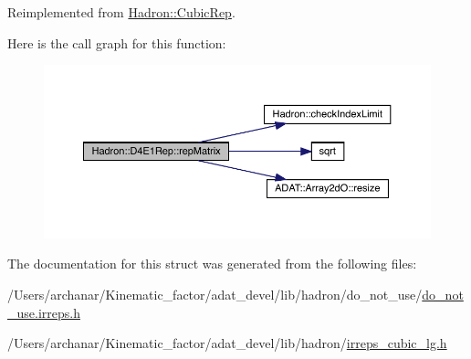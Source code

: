Reimplemented from \mbox{\hyperlink{structHadron_1_1CubicRep_ac5d7e9e6f4ab1158b5fce3e4ad9e8005}{Hadron\+::\+Cubic\+Rep}}.

Here is the call graph for this function\+:
\nopagebreak
\begin{figure}[H]
\begin{center}
\leavevmode
\includegraphics[width=350pt]{da/d78/structHadron_1_1D4E1Rep_a8a0fcfa06e2a36d6835bab2431654a2f_cgraph}
\end{center}
\end{figure}


The documentation for this struct was generated from the following files\+:\begin{DoxyCompactItemize}
\item 
/\+Users/archanar/\+Kinematic\+\_\+factor/adat\+\_\+devel/lib/hadron/do\+\_\+not\+\_\+use/\mbox{\hyperlink{do__not__use_8irreps_8h}{do\+\_\+not\+\_\+use.\+irreps.\+h}}\item 
/\+Users/archanar/\+Kinematic\+\_\+factor/adat\+\_\+devel/lib/hadron/\mbox{\hyperlink{lib_2hadron_2irreps__cubic__lg_8h}{irreps\+\_\+cubic\+\_\+lg.\+h}}\end{DoxyCompactItemize}
